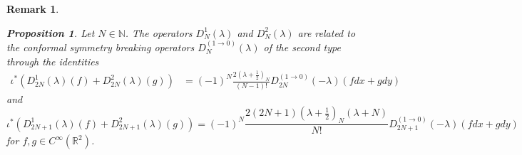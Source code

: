 \documentclass[a4paper,12pt,reqno]{amsart}
\newtheorem{prop}[theorem]{Proposition}
\newtheorem{bem}[theorem]{Remark}
\numberwithin{theorem}{subsection}
\numberwithin{equation}{section}
\begin{document}
\begin{bem}
\begin{prop}\label{KKP-rel} Let $N\in{\mathbb{N}}$. The operators $D^1_N(\lambda)$ and $D^2_N(\lambda)$ are related
to the conformal symmetry breaking operators $D^{(1\to 0)}_{N}(\lambda)$ of the
second type through the identities
\begin{align}
   \iota^* (D^1_{2N}(\lambda)(f) + D^2_{2N}(\lambda)(g)) & = (-1)^N \frac{2 (\lambda+\frac 12)_N}{(N-1)!}
   D^{(1\to 0)}_{2N}(-\lambda)(f{d} x + g{d} y) \label{eq:KKPId1}
\end{align}
and
\begin{equation}
   \iota^*(D^1_{2N+1}(\lambda)(f) + D^2_{2N+1}(\lambda)(g))
   = (-1)^N \frac{2(2N\!+\!1) (\lambda\!+\!\frac 12)_N (\lambda\!+\!N)}{N!}
   D^{(1\to 0)}_{2N+1}(-\lambda)(f{d} x + g{d} y) \label{eq:KKPId2}
\end{equation}
for $f, g \in C^\infty({\mathbb{R}}^2)$.
\end{prop}


\end{bem}
\end{document}
